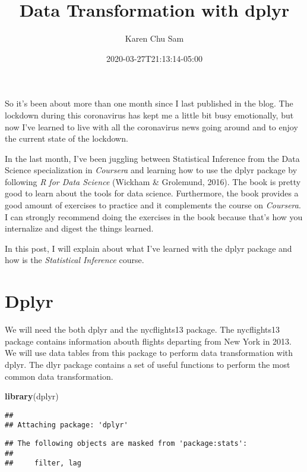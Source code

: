 \documentclass[
]{article}
\title{Data Transformation with dplyr}
\author{Karen Chu Sam}
\date{2020-03-27T21:13:14-05:00}
\newenvironment{Shaded}{\begin{snugshade}}{\end{snugshade}}
\newcommand{\KeywordTok}[1]{\textcolor[rgb]{0.13,0.29,0.53}{\textbf{#1}}}
\newcommand{\NormalTok}[1]{#1}
\begin{document}
\maketitle

So it's been about more than one month since I last published in the
blog. The lockdown during this coronavirus has kept me a little bit busy
emotionally, but now I've learned to live with all the coronavirus news
going around and to enjoy the current state of the lockdown.

In the last month, I've been juggling between Statistical Inference from
the Data Science specialization in \emph{Coursera} and learning how to
use the dplyr package by following \emph{R for Data Science} (Wickham \&
Grolemund, 2016). The book is pretty good to learn about the tools for
data science. Furthermore, the book provides a good amount of exercises
to practice and it complements the course on \emph{Coursera}. I can
strongly recommend doing the exercises in the book because that's how
you internalize and digest the things learned.

In this post, I will explain about what I've learned with the dplyr
package and how is the \emph{Statistical Inference} course.

\hypertarget{dplyr}{%
\section{Dplyr}\label{dplyr}}

We will need the both dplyr and the nycflights13 package. The
nycflights13 package contains information abouth flights departing from
New York in 2013. We will use data tables from this package to perform
data transformation with dplyr. The dlyr package contains a set of
useful functions to perform the most common data transformation.

\begin{Shaded}
\begin{Highlighting}[]
\KeywordTok{library}\NormalTok{(dplyr)}
\end{Highlighting}
\end{Shaded}

\begin{verbatim}
## 
## Attaching package: 'dplyr'
\end{verbatim}

\begin{verbatim}
## The following objects are masked from 'package:stats':
## 
##     filter, lag
\end{verbatim}
\end{document}
